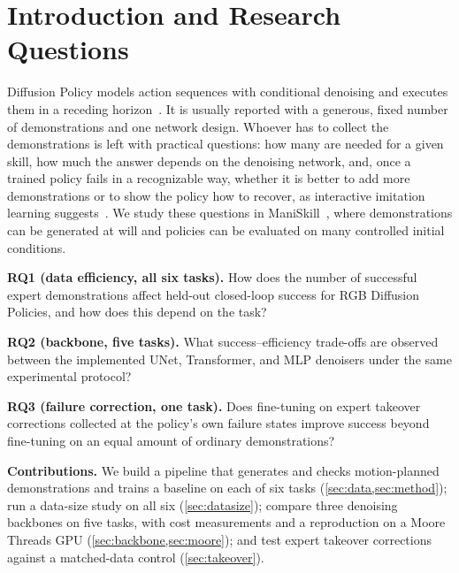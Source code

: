 \section{Introduction and Research Questions}
\label{sec:introduction}
Diffusion Policy models action sequences with conditional denoising and
executes them in a receding horizon~\citep{chi2023diffusion}. It is usually
reported with a generous, fixed number of demonstrations and one network
design. Whoever has to collect the demonstrations is left with practical
questions: how many are needed for a given skill, how much the answer depends
on the denoising network, and, once a trained policy fails in a recognizable
way, whether it is better to add more demonstrations or to show the policy how
to recover, as interactive imitation learning suggests~\citep{ross2011dagger}.
We study these questions in ManiSkill~\citep{tao2024maniskill3}, where
demonstrations can be generated at will and policies can be evaluated on many
controlled initial conditions.

\textbf{RQ1 (data efficiency, all six tasks).} How does the number of successful
expert demonstrations affect held-out closed-loop success for RGB Diffusion
Policies, and how does this depend on the task?

\textbf{RQ2 (backbone, five tasks).} What success--efficiency trade-offs are
observed between the implemented UNet, Transformer, and MLP denoisers under the
same experimental protocol?

\textbf{RQ3 (failure correction, one task).} Does fine-tuning on expert takeover
corrections collected at the policy's own failure states improve success beyond
fine-tuning on an equal amount of ordinary demonstrations?

\textbf{Contributions.} We build a pipeline that generates and checks
motion-planned demonstrations and trains a baseline on each of six tasks
(\cref{sec:data,sec:method}); run a data-size study on all six
(\cref{sec:datasize}); compare three denoising backbones on five tasks, with
cost measurements and a reproduction on a Moore Threads GPU
(\cref{sec:backbone,sec:moore}); and test expert takeover corrections against a
matched-data control (\cref{sec:takeover}).
